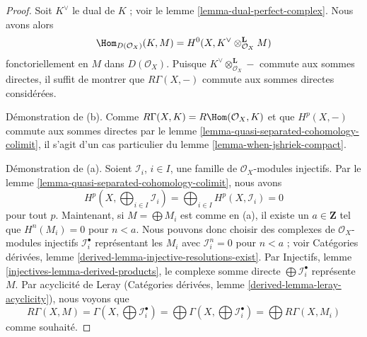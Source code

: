 {\begin{lemma}
\begin{enumerate}
\end{enumerate}

\end{lemma}

\begin{proof}
Soit $K^\vee$ le dual de $K$ ; voir le lemme \ref{lemma-dual-perfect-complex}. Nous avons alors $$
\Hom_{D(\mathcal{O}_X)}(K, M) =
H^0(X, K^\vee \otimes_{\mathcal{O}_X}^\mathbf{L} M)
$$ fonctoriellement en $M$ dans $D(\mathcal{O}_X)$. Puisque $K^\vee \otimes_{\mathcal{O}_X}^\mathbf{L} -$ commute aux sommes directes, il suffit de montrer que $R\Gamma(X, -)$ commute aux sommes directes considérées.

\medskip\noindent
Démonstration de (b). Comme $R\Gamma(X, K) = R\Hom(\mathcal{O}_X, K)$ et que $H^p(X, -)$ commute aux sommes directes par le lemme \ref{lemma-quasi-separated-cohomology-colimit}, il s'agit d'un cas particulier du lemme \ref{lemma-when-jshriek-compact}.

\medskip\noindent

Démonstration de (a). Soient $\mathcal{I}_i$, $i \in I$, une famille de
$\mathcal{O}_X$-modules injectifs. Par le lemme \ref{lemma-quasi-separated-cohomology-colimit},
nous avons
$$
H^p(X, \bigoplus\nolimits_{i \in I} \mathcal{I}_i) =
\bigoplus\nolimits_{i \in I} H^p(X, \mathcal{I}_i) = 0
$$
pour tout $p$. Maintenant, si $M = \bigoplus M_i$ est comme en (a), il existe un $a \in \mathbf{Z}$ tel que $H^n(M_i) = 0$
pour $n < a$. Nous pouvons donc choisir des complexes de $\mathcal{O}_X$-modules injectifs
$\mathcal{I}_i^\bullet$ représentant les $M_i$
avec $\mathcal{I}_i^n = 0$ pour $n < a$ ; voir Catégories dérivées, lemme \ref{derived-lemma-injective-resolutions-exist}. Par Injectifs, lemme \ref{injectives-lemma-derived-products},
le complexe somme directe $\bigoplus \mathcal{I}_i^\bullet$
représente $M$. Par acyclicité de Leray (Catégories dérivées, lemme \ref{derived-lemma-leray-acyclicity}), nous voyons que
$$
R\Gamma(X, M) = \Gamma(X, \bigoplus \mathcal{I}_i^\bullet) =
\bigoplus \Gamma(X, \bigoplus \mathcal{I}_i^\bullet) =
\bigoplus R\Gamma(X, M_i)
$$
comme souhaité.

\end{proof}

















}

